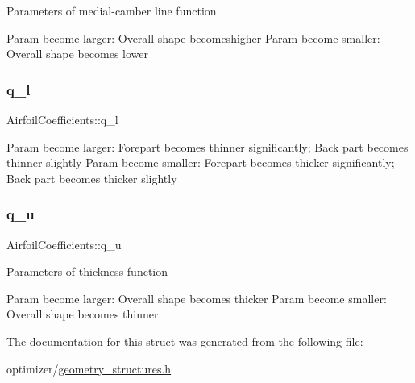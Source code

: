 Parameters of medial-\/camber line function

Param become larger\+: Overall shape becomeshigher Param become smaller\+: Overall shape becomes lower \hypertarget{struct_airfoil_coefficients_aed33b0307a2bfcee3531fa2b240de679}{}\label{struct_airfoil_coefficients_aed33b0307a2bfcee3531fa2b240de679} 
\subsubsection{\texorpdfstring{q\+\_\+l}{q\_l}}
{\footnotesize\ttfamily Airfoil\+Coefficients\+::q\+\_\+l}

Param become larger\+: Forepart becomes thinner significantly; Back part becomes thinner slightly Param become smaller\+: Forepart becomes thicker significantly; Back part becomes thicker slightly \hypertarget{struct_airfoil_coefficients_a5d7aa2c02b9adfe9adcc86d2034f647f}{}\label{struct_airfoil_coefficients_a5d7aa2c02b9adfe9adcc86d2034f647f} 
\subsubsection{\texorpdfstring{q\+\_\+u}{q\_u}}
{\footnotesize\ttfamily Airfoil\+Coefficients\+::q\+\_\+u}

Parameters of thickness function

Param become larger\+: Overall shape becomes thicker Param become smaller\+: Overall shape becomes thinner 

The documentation for this struct was generated from the following file\+:\begin{DoxyCompactItemize}
\item 
optimizer/\hyperlink{geometry__structures_8h}{geometry\+\_\+structures.\+h}\end{DoxyCompactItemize}
